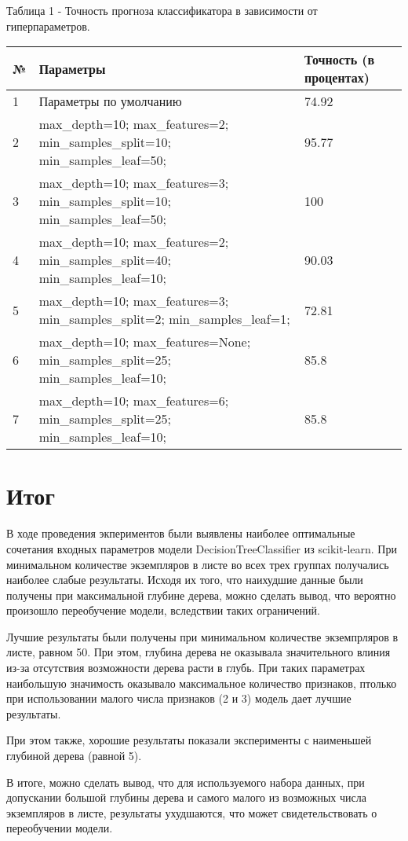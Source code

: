 \documentclass[a4paper,12pt]{article}
\begin{document}
	\vspace{0.5cm}
	Таблица 1 - Точность прогноза классификатора в зависимости от гиперпараметров.
\begin{longtable}{|p{1cm}|p{9cm}|p{3cm}|}
\hline
№ & Параметры & Точность (в процентах) \\ 
\hline 
1 & Параметры по умолчанию & 74.92 \\
\hline
2 & max\_depth=10; max\_features=2; min\_samples\_split=10; min\_samples\_leaf=50; & 95.77 \\
\hline 
3 & max\_depth=10; max\_features=3; min\_samples\_split=10; min\_samples\_leaf=50; & 100 \\
\hline 
4 & max\_depth=10; max\_features=2; min\_samples\_split=40; min\_samples\_leaf=10; & 90.03 \\
\hline 
5 & max\_depth=10; max\_features=3; min\_samples\_split=2; min\_samples\_leaf=1; & 72.81 \\
\hline 
6 & max\_depth=10; max\_features=None; min\_samples\_split=25; min\_samples\_leaf=10; & 85.8 \\
\hline
7 & max\_depth=10; max\_features=6; min\_samples\_split=25; min\_samples\_leaf=10; & 85.8 \\

\hline
\end{longtable}


\newpage\section{Итог}
	В ходе проведения экпериментов были выявлены наиболее оптимальные сочетания входных параметров модели DecisionTreeClassifier из scikit-learn. При минимальном количестве экземпляров в листе во всех трех группах получались наиболее слабые результаты. Исходя их того, что наихудшие данные были получены при максимальной глубине дерева, можно сделать вывод, что вероятно произошло переобучение модели, вследствии таких ограничений. 
	
	\vspace{0.5cm}
	Лучшие результаты были получены при минимальном количестве экземпрляров в листе, равном 50. При этом, глубина дерева не оказывала значительного влиния из-за отсутствия возможности дерева расти в глубь. При таких параметрах наибольшую значимость оказывало максимальное количество признаков, птолько при использовании малого числа признаков (2 и 3) модель дает лучшие результаты. 
	
	\vspace{0.5cm}
	При этом также, хорошие результаты показали эксперименты с наименьшей глубиной дерева (равной 5).
	
	\vspace{0.5cm}
	В итоге, можно сделать вывод, что для используемого набора данных, при допускании большой глубины дерева и самого малого из возможных числа экземпляров в листе, результаты ухудшаются, что может свидетельствовать о переобучении модели.
	
	
\end{document}
